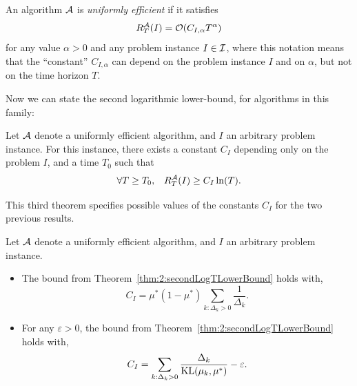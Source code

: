\begin{defn}\label{def:2:uniformlyEfficientAlgorithm}
    An algorithm $\mathcal{A}$ is \emph{uniformly efficient} if it satisfies
    \begin{equation}
        R_T^{\mathcal{A}}(I) = \mathop{}\mathopen{}\mathcal{O}\mathopen{}\left(C_{I,\alpha} T^{\alpha}\right)
    \end{equation}
    for any value $\alpha>0$ and any problem instance $I\in \mathcal{I}$,
    where this notation means that the ``constant'' $C_{I,\alpha}$ can depend on the problem instance $I$ and on $\alpha$, but not on the time horizon $T$.
\end{defn}

Now we can state the second logarithmic lower-bound, for algorithms in this family:

\begin{theorem}\label{thm:2:secondLogTLowerBound}
    Let $\mathcal{A}$ denote a uniformly efficient algorithm,
    and $I$ an arbitrary problem instance.
    For this instance,
    there exists a constant $C_I$ depending only on the problem $I$,
    and a time $T_0$ such that
    \begin{equation}
        \forall T \geq T_0, \;\;\; R_T^{\mathcal{A}}(I) \geq C_I \ln(T).
    \end{equation}
\end{theorem}

This third theorem specifies possible values of the constants $C_I$ for the two previous results.

\begin{theorem}\label{thm:2:forSecondLogTLowerBound}
    Let $\mathcal{A}$ denote a uniformly efficient algorithm,
    and $I$ an arbitrary problem instance.
    \begin{itemize}
        \item
        The bound from Theorem~\ref{thm:2:secondLogTLowerBound} holds with,
        \begin{equation}\label{eq:2:forSecondLogTLowerBound}
            C_I = \mu^* (1 - \mu^*) \sum_{k: \Delta_k > 0} \frac{1}{\Delta_k}.
        \end{equation}
        \item
        For any $\varepsilon>0$, the bound from Theorem~\ref{thm:2:secondLogTLowerBound} holds with,
        \begin{equation}\label{eq:2:forSecondLogTLowerBound2}
            C_I = \sum_{k: \Delta_k > 0} \frac{\Delta_k}{\mathrm{KL}(\mu_k, \mu^*)} - \varepsilon.
        \end{equation}
    \end{itemize}
\end{theorem}




